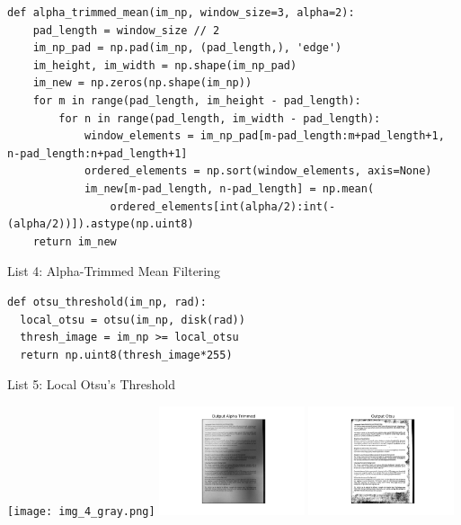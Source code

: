 \documentclass[titlepage]{article}
\begin{document}
\begin{listing}
\begin{verbatim}
def alpha_trimmed_mean(im_np, window_size=3, alpha=2):
    pad_length = window_size // 2
    im_np_pad = np.pad(im_np, (pad_length,), 'edge')
    im_height, im_width = np.shape(im_np_pad)
    im_new = np.zeros(np.shape(im_np))
    for m in range(pad_length, im_height - pad_length):
        for n in range(pad_length, im_width - pad_length):
            window_elements = im_np_pad[m-pad_length:m+pad_length+1, n-pad_length:n+pad_length+1]
            ordered_elements = np.sort(window_elements, axis=None)
            im_new[m-pad_length, n-pad_length] = np.mean(
                ordered_elements[int(alpha/2):int(-(alpha/2))]).astype(np.uint8)
    return im_new
\end{verbatim}
\centering
\caption{List 4: Alpha-Trimmed Mean Filtering}
\newline
\end{listing}

\begin{listing}
\begin{verbatim}
def otsu_threshold(im_np, rad):
  local_otsu = otsu(im_np, disk(rad))
  thresh_image = im_np >= local_otsu
  return np.uint8(thresh_image*255)
\end{verbatim}
\centering
\caption{List 5: Local Otsu's Threshold}
\newline
\end{listing}

\begin{center}
\texttt{[image: img\_4\_gray.png]}
\includegraphics[width=0.32\textwidth]{img_4_output_alpha_trimmed.png}
\includegraphics[width=0.32\textwidth]{img_4_output_otsu.png}
\end{center}
\end{document}
